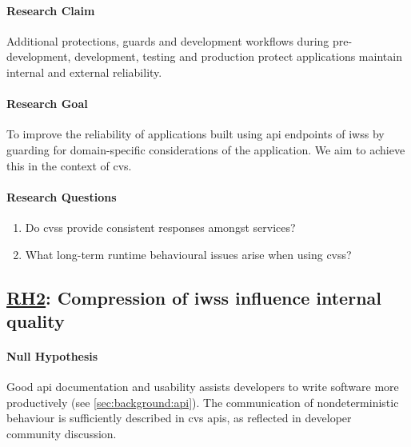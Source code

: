 \paragraph{Research Claim}
Additional protections, guards and development workflows during pre-development, development, testing and production protect applications maintain internal and external reliability.

\paragraph{Research Goal}
To improve the reliability of applications built using \gls{api} endpoints of \glspl{iws} by guarding for domain-specific considerations of the application. We aim to achieve this in the context of \gls{cvs}.

\paragraph{Research Questions}
\begin{enumerate}[label=\textbf{RQ1.\arabic*.}, ref=RQ1.\arabic*, leftmargin=3.5\parindent, rightmargin=1\parindent]
  \item {} Do \glspl{cvs} provide consistent responses amongst services?
  \item {} What long-term runtime behavioural issues arise when using \glspl{cvs}?
\end{enumerate}

\subsection[Research Hypothesis 2]{\underline{RH2}: Compression of \glspl{iws} influence internal quality}
\label{rh2}



\paragraph{Null Hypothesis}
Good \gls{api} documentation and usability assists developers to write software more productively (see \cref{sec:background:api}). The communication of nondeterministic behaviour is sufficiently described in \gls{cvs} \glspl{api}, as reflected in developer community discussion.

